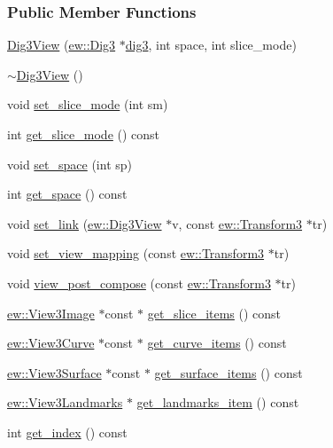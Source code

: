 \subsubsection*{Public Member Functions}
\begin{DoxyCompactItemize}
\item 
\hyperlink{classew_1_1Dig3View_a50bf8f0ce6c29fa0f2a0e7f6bc7ba7bd}{Dig3View} (\hyperlink{classew_1_1Dig3}{ew::Dig3} $\ast$\hyperlink{classew_1_1Dig3View_af168346e6f66801de1d09ac262d55778}{dig3}, int space, int slice\_\-mode)
\item 
\hyperlink{classew_1_1Dig3View_a42119dd232d7912a3b2c5ac6bb1c2e59}{$\sim$Dig3View} ()
\item 
void \hyperlink{classew_1_1Dig3View_a5e4afce808324fc93b9c8dfb76c5e374}{set\_\-slice\_\-mode} (int sm)
\item 
int \hyperlink{classew_1_1Dig3View_a9f52b3a596a26a19e14ff3c14fecd8bb}{get\_\-slice\_\-mode} () const 
\item 
void \hyperlink{classew_1_1Dig3View_a2dd21d8d92c1e4fd3b6db3605a917208}{set\_\-space} (int sp)
\item 
int \hyperlink{classew_1_1Dig3View_ad22d8d32c11fa5e1300af7f193b08bbf}{get\_\-space} () const 
\item 
void \hyperlink{classew_1_1Dig3View_aa4ca632104fa5d74443e5444ffe6a353}{set\_\-link} (\hyperlink{classew_1_1Dig3View}{ew::Dig3View} $\ast$v, const \hyperlink{classew_1_1Transform3}{ew::Transform3} $\ast$tr)
\item 
void \hyperlink{classew_1_1Dig3View_a2a65eaef54bdbb099f038443779c932c}{set\_\-view\_\-mapping} (const \hyperlink{classew_1_1Transform3}{ew::Transform3} $\ast$tr)
\item 
void \hyperlink{classew_1_1Dig3View_aa90d11b918a9c0e27399acd495ecd669}{view\_\-post\_\-compose} (const \hyperlink{classew_1_1Transform3}{ew::Transform3} $\ast$tr)
\item 
\hyperlink{classew_1_1View3Image}{ew::View3Image} $\ast$const $\ast$ \hyperlink{classew_1_1Dig3View_af18fd260d6c6298c9472a7d52574560d}{get\_\-slice\_\-items} () const 
\item 
\hyperlink{classew_1_1View3Curve}{ew::View3Curve} $\ast$const $\ast$ \hyperlink{classew_1_1Dig3View_ad814bd3f449aec44fc66a6667c7766e9}{get\_\-curve\_\-items} () const 
\item 
\hyperlink{classew_1_1View3Surface}{ew::View3Surface} $\ast$const $\ast$ \hyperlink{classew_1_1Dig3View_aaa1719f8cfbf61e71c56b9a4af37e048}{get\_\-surface\_\-items} () const 
\item 
\hyperlink{classew_1_1View3Landmarks}{ew::View3Landmarks} $\ast$ \hyperlink{classew_1_1Dig3View_a669e570e748ac09e014ede10d82deaea}{get\_\-landmarks\_\-item} () const 
\item 
int \hyperlink{classew_1_1Dig3View_afda34fa72824b91563abe90e9736bfa5}{get\_\-index} () const 
\end{DoxyCompactItemize}
